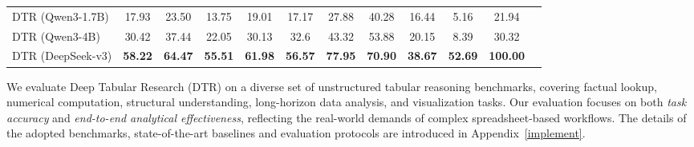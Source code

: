 \begin{table}[ht!]
{\begin{tabular}{@{}l|cc|cc|cc|cc|ccc@{}}
\midrule
\midrule
DTR (Qwen3-1.7B) & 17.93 & 23.50 & 13.75 & 19.01 & 17.17 & 27.88 & 40.28 & 16.44 & 5.16 & 21.94 \\
DTR (Qwen3-4B) & 30.42 & 37.44 & 22.05 & 30.13 & 32.6 & 43.32 & 53.88 & 20.15 & 8.39 & 30.32 \\
DTR (DeepSeek-v3) &\textbf{58.22} &\textbf{64.47} &\textbf{55.51} &\textbf{61.98} &\textbf{56.57} &\textbf{77.95} &\textbf{70.90} &\textbf{38.67} &\textbf{52.69} & \textbf{100.00} \\							
\bottomrule
\end{tabular}%
\label{exp: real}
}
\end{table}

We evaluate Deep Tabular Research (DTR) on a diverse set of unstructured tabular reasoning benchmarks, covering factual lookup, numerical computation, structural understanding, long-horizon data analysis, and visualization tasks. 
Our evaluation focuses on both \emph{task accuracy} and \emph{end-to-end analytical effectiveness}, reflecting the real-world demands of complex spreadsheet-based workflows. The details of the adopted benchmarks, state-of-the-art baselines and evaluation protocols are introduced in Appendix~\ref{implement}.



